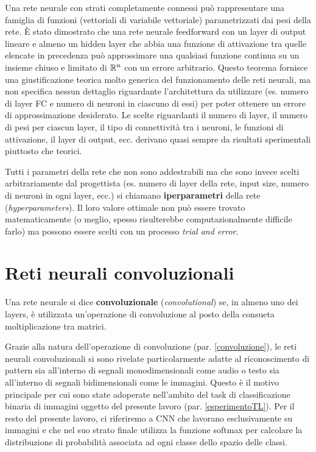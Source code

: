 Una rete neurale con strati completamente connessi può rappresentare una famiglia di funzioni (vettoriali di variabile vettoriale) parametrizzati dai pesi della rete.
È stato dimostrato \cite{approximation} che una rete neurale feedforward con un layer di output lineare e
almeno un hidden layer che abbia una funzione di attivazione tra quelle elencate in
precedenza può approssimare una qualsiasi funzione continua su un insieme chiuso e limitato di
$\mathbb{R}^{n}$ con un errore arbitrario.
Questo teorema fornisce una giustificazione teorica molto generica del funzionamento
delle reti neurali, ma non specifica nessun dettaglio riguardante l’architettura da utilizzare (es. numero di layer FC e numero di neuroni in ciascuno di essi)
per poter ottenere un errore di approssimazione desiderato. Le scelte riguardanti il
numero di layer, il numero di pesi per ciascun layer, il tipo di connettività tra i neuroni,
le funzioni di attivazione, il layer di output, ecc. derivano quasi sempre da risultati
sperimentali piuttosto che teorici.

Tutti i parametri della rete che non sono addestrabili ma che sono invece scelti arbitrariamente dal progettista (es. numero di layer della rete, input size, numero di neuroni in ogni layer, ecc.) si chiamano \textbf{iperparametri} della rete (\textit{hyperparameters}). Il loro valore ottimale non può essere trovato matematicamente (o meglio, spesso risulterebbe computazionalmente difficile farlo) ma possono essere scelti con un processo \textit{trial and error}.

\section{Reti neurali convoluzionali}
\label{CNN}
Una rete neurale si dice \textbf{convoluzionale} (\textit{convolutional}) se, in almeno uno dei layers, è utilizzata un'operazione di convoluzione al posto della consueta moltiplicazione tra matrici.

Grazie alla natura dell'operazione di convoluzione (par. \ref{convoluzione}), le reti neurali convoluzionali si sono rivelate particolarmente adatte al riconoscimento di pattern sia all'interno di segnali monodimensionali come audio o testo sia all'interno di segnali bidimensionali come le immagini. Questo è il motivo principale per cui sono state adoperate nell'ambito del task di classificazione binaria di immagini oggetto del presente lavoro (par. \ref{esperimentoTL}).
Per il resto del presente lavoro, ci riferiremo a CNN che lavorano esclusivamente su immagini e che nel suo strato finale utilizza la funzione softmax per calcolare la distribuzione di probabilità associata ad ogni classe dello spazio delle classi.


